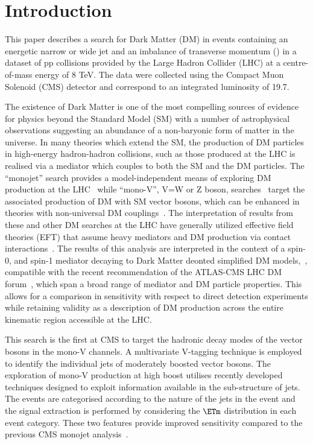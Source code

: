 \section{Introduction}
This paper describes a search for Dark Matter (DM) in events containing an energetic narrow or wide jet and an imbalance of transverse momentum (\ETm) in a dataset 
of pp collisions provided by the Large Hadron Collider (LHC) at a centre-of-mass energy of 8 TeV. The data were collected using the Compact Muon Solenoid (CMS) 
detector and correspond to an integrated luminosity of 19.7\fbinv. 

The existence of Dark Matter is one of the most compelling sources of evidence for physics beyond the Standard Model (SM) with a number of astrophysical observations 
suggesting an abundance of a non-baryonic form of matter in the universe. In many theories which extend the SM, the production of DM particles in high-energy hadron-hadron 
collisions, such as those produced at the LHC is realised via a mediator which couples to both the SM and the DM particles.  
The ``monojet'' search provides a model-independent means of exploring DM production at the LHC~\cite{monojet1,monojet2} while 
 ``mono-V'', V=W or Z boson, searches~\cite{monolep,Aad:2014vka,Aad:2013oja,ATLAS:2014wra} target the associated production of DM with SM vector bosons, 
which can be enhanced in theories with non-universal DM couplings~\cite{IVDM}.  The interpretation of results from these and other DM searches at 
the LHC have generally utilized effective field theories (EFT) that assume heavy mediators and DM production via contact interactions~\cite{Fox:2011pm}.  
The results of this analysis are interpreted in the context of a spin-0, and spin-1 mediator decaying to Dark Matter deonted simplified DM models,~\cite{simplified1,Buchmueller:2013dya,Buchmueller:2014yoa}, compatible with the recent recommendation of the ATLAS-CMS LHC DM forum~\cite{Abercrombie:2015wmb}, which span a broad range of 
mediator and DM particle properties. This allows for a comparison in sensitivity with respect to direct detection experiments while retaining validity as a description of DM 
production across the entire kinematic region accessible at the LHC. 

This search is the first at CMS to target the hadronic decay modes of the vector bosons in the mono-V channels. A multivariate V-tagging technique is 
employed to identify the individual jets of moderately boosted vector bosons. The exploration of mono-V production at high boost 
utilises recently developed techniques designed to exploit information 
available in the sub-structure of jets. The events are categorised according to the nature of the jets in the event and the signal extraction is performed by 
considering the $\ETm$ distribution in each event category. These two features provide improved sensitivity compared to the previous CMS monojet analysis~\cite{monojet1}. 


